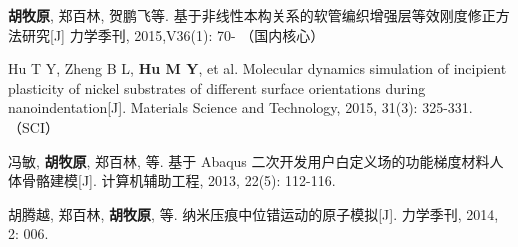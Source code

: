 
\begin{publications}{99}



	

    
\end{publications}

\begin{compactenum}

\item {\bf 胡牧原}, 郑百林, 贺鹏飞等. 基于非线性本构关系的软管编织增强层等效刚度修正方法研究[J]  力学季刊, 2015,V36(1): 70-   （国内核心）


\item Hu T Y, Zheng B L, {\bf Hu M Y}, et al. Molecular dynamics simulation of incipient plasticity of nickel substrates of different surface orientations during nanoindentation[J]. Materials Science and Technology, 2015, 31(3): 325-331.（SCI）

\item 冯敏, \textbf{胡牧原}, 郑百林, 等. 基于 Abaqus 二次开发用户白定义场的功能梯度材料人体骨骼建模[J]. 计算机辅助工程, 2013, 22(5): 112-116.


\item 胡腾越, 郑百林, \textbf{胡牧原}, 等. 纳米压痕中位错运动的原子模拟[J]. 力学季刊, 2014, 2: 006.	
\end{compactenum}